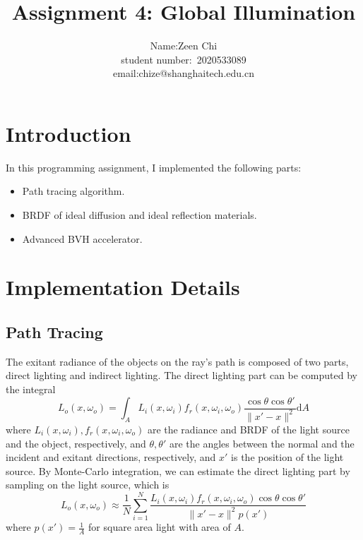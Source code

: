 \documentclass[acmtog]{acmart}
\title{Assignment 4: {Global Illumination}}
\author{Name:\quad Zeen Chi  \\ student number:\ 2020533089
\\email:\quad chize@shanghaitech.edu.cn}
\begin{document}
\maketitle

\vspace*{2 ex}

\section{Introduction}
\hspace{8pt}
In this programming assignment, I implemented the following parts:
\begin{itemize}
    \item Path tracing algorithm.
    \item BRDF of ideal diffusion and ideal reflection materials.
    \item Advanced BVH accelerator.
\end{itemize}

\section{Implementation Details}
\subsection{Path Tracing}
\hspace{8pt}
The exitant radiance of the objects on the ray's path is composed of two parts, direct lighting and indirect lighting. The direct lighting part can be computed by the integral
\[
L_o(x,\omega_o)=\int_AL_i(x,\omega_i)f_r(x,\omega_i,\omega_o)\frac{\cos\theta\cos\theta'}{\|x'-x\|^2}\mathrm{d}A    
\]
where $L_i(x,\omega_i),f_r(x,\omega_i,\omega_o)$ are the radiance and BRDF of the light source and the object, respectively, and $\theta,\theta'$ are the angles between the normal and the incident and exitant directions, respectively, and $x'$ is the position of the light source. By Monte-Carlo integration, we can estimate the direct lighting part by sampling on the light source, which is
\[
    L_o(x,\omega_o)\approx\frac{1}{N}\sum_{i=1}^N\frac{L_i(x,\omega_i)f_r(x,\omega_i,\omega_o)\cos\theta\cos\theta'}{\|x'-x\|^2p(x')}
\]
where $p(x')=\frac{1}{A}$ for square area light with area of $A$.
\end{document}
